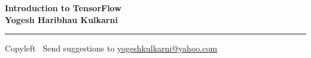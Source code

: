 
\graphicspath{{images/}}

\footnotesize


\begin{center}
\Large{\textbf{Introduction to TensorFlow\\ Yogesh Haribhau Kulkarni}}  
\end{center}

\begin{multicols}{2}

\end{multicols}

\rule{\linewidth}{0.25pt}
\scriptsize
Copyleft \textcopyleft\  Send suggestions to 
\href{http://yati.io}{yogeshkulkarni@yahoo.com}


